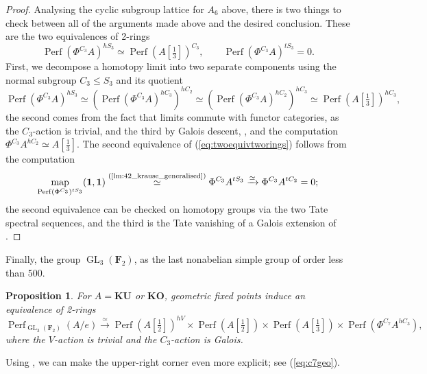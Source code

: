 \documentclass[11pt, a4paper]{article}
\DeclareMathOperator{\GL}{GL}
\newcommand{\1}{\mathbf{1}}
\newcommand{\gKU}{{\mathbf{KU}}}
\newcommand{\gKO}{{\mathbf{KO}}}
\DeclareMathOperator{\map}{map}
\DeclareMathOperator{\Perf}{Perf}
\newcommand{\F}{\mathbf{F}}
\theoremstyle{plain}
\newtheorem{prop}[equation]{Proposition}
\theoremstyle{definition}
\theoremstyle{remark}\numberwithin{equation}{section}
\begin{document}
\begin{proof}
    Analysing the cyclic subgroup lattice for $A_6$ above, there is two things to check between all of the arguments made above and the desired conclusion. These are the two equivalences of 2-rings
    \begin{equation}\label{eq:twoequivtworings}\Perf(\Phi^{C_3} A)^{hS_3} \simeq \Perf(A[\tfrac{1}{3}])^{C_3}, \qquad \Perf(\Phi^{C_3} A)^{tS_3} = 0.\end{equation}
    First, we decompose a homotopy limit into two separate components using the normal subgroup $C_3\leq S_3$ and its quotient
    \[\Perf(\Phi^{C_3} A)^{hS_3} \simeq (\Perf(\Phi^{C_3} A)^{hC_3})^{hC_2} \simeq (\Perf(\Phi^{C_3} A)^{hC_2})^{hC_3} \simeq \Perf(A[\tfrac{1}{3}])^{hC_3},\]
    the second comes from the fact that limits commute with functor categories, as the $C_3$-action is trivial, and the third by Galois descent, , and the computation $\Phi^{C_3} A^{hC_2} \simeq A[\tfrac{1}{3}]$. The second equivalence of (\ref{eq:twoequivtworings}) follows from the computation
    \[\map_{\Perf(\Phi^{C_3})^{tS_3}}(\1,\1) \overset{\text{(\ref{lm:42_krause_generalised})}}{\simeq} \Phi^{C_3} A^{tS_3} \xrightarrow{\simeq} \Phi^{C_3} A^{tC_2} = 0;\]
    the second equivalence can be checked on homotopy groups via the two Tate spectral sequences, and the third is the Tate vanishing of a Galois extension of .
\end{proof}

Finally, the group $\GL_3(\F_2)$, as the last nonabelian simple group of order less than $500$.

\begin{prop}\label{pr:KU_decomp_GL3F2}
    For $A=\gKU$ or $\gKO$, geometric fixed points induce an equivalence of 2-rings
    \[\Perf_{\GL_3(\F_2)}(A/e) \xrightarrow{\simeq} {\Perf(A[\tfrac{1}{2}])^{hV} \times \Perf(A[\tfrac{1}{2}]) \times \Perf(A[\tfrac{1}{3}]) \times \Perf(\Phi^{C_7} A^{hC_3})},\]
    where the $V$-action is trivial and the $C_3$-action is Galois.
\end{prop}

Using , we can make the upper-right corner even more explicit; see (\ref{eq:c7geo}).

\end{document}
